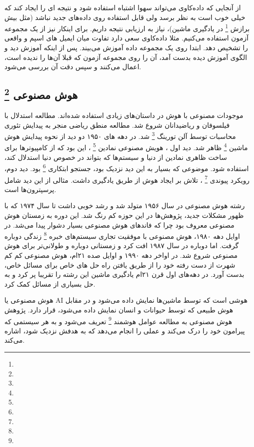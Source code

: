 \documentclass[a4paper, 12pt]{article}
\begin{document}
 از آنجایی که داده‌کاوی می‌تواند سهوا اشتباه استفاده شود و نتیجه ای را ایجاد کند که خیلی خوب است به نظر برسد ولی قابل استفاده روی داده‌های جدید نباشد (مثل بیش برازش
 \footnote{}
  در یادگیری ماشین)، نیاز به ارزیابی نتیجه داریم. برای اینکار نیز از یک مجموعه آزمون استفاده می‌کنیم. مثلا داده‌کاوی سعی دارد تفاوت میان ایمیل های اسپم و واقعی را تشخیص دهد. ابتدا روی یک مجموعه داده آموزش می‌بیند. پس از اینکه آموزش دید و الگوی آموزش دیده بدست آمد، آن را روی مجموعه آزمون که قبلا آن‌ها را ندیده است، اعمال می‌کنند و سپس دقت آن بررسی می‌شود. 
  
   \subsection*{هوش مصنوعی
   \footnote{}
	}
 موجودات مصنوعی با هوش در داستان‌های زیادی استفاده شده‌اند. مطالعه استدلال با  فیلسوفان و ریاضیدانان شروع شد.  مطالعه منطق ریاضی منجر به پیدایش تئوری محاسبات توسط آلن تورینگ 
 \footnote{}
 شد. در دهه های ۱۹۵۰ دو دید از نحوه پیدایش هوش ماشین 
 \footnote{}
 ظاهر شد. دید اول ، هویش مصنوعی نمادین 
 \footnote{}
 ، این بود که از کامپیوترها برای ساخت  
 ظاهری نمادین از دنیا و سیستم‌ها که بتواند در خصوص دنیا استدلال کند،
 استفاده شود. موضوعی که بسیار به این دید نزدیک بود، جستجو ابتکاری 
 \footnote{}
 بود. دید دوم، رویکرد پیوندی 
 \footnote{}
، تلاش بر ایجاد هوش از طریق یادگیری داشت. مثالی از این دید شامل پرسپترون‌ها است. 

رشته هوش مصنوعی در سال ۱۹۵۶ متولد شد و رشد خوبی داشت تا سال ۱۹۷۴ که با ظهور مشکلات جدید، پژوهش‌ها در این حوزه کم رنگ شد. این دوره به زمستان هوش مصنوعی معروف بود چرا که فاند‌های هوش مصنوعی بسیار دشوار پیدا می‌شد. در اوایل دهه ۱۹۸۰، هوش مصنوعی با موفقیت تجاری سیستم‌های خبره
\footnote{}
زندگی دوباره گرفت.  اما دوباره در سال ۱۹۸۷ افت کرد و زمستانی دوباره و طولانی‌تر برای هوش مصنوعی شروع شد. در اواخر دهه ۱۹۹۰ و اوایل صده ۲۱ام، هوش مصنوعی کم کم شهرت از دست رفته خود را   از طریق یافتن راه حل های خاص برای مسائل خاص، بدست آورد.
در دهه‌های اول قرن ۲۱ام یادگیری ماشین این رشته را تقریبا پر کرد و به حل بسیاری از مسائل کمک کرد.
 
 هوش مصنوعی یا AI هوشی است که توسط ماشین‌ها نمایش داده می‌شود و در مقابل هوش طبیعی که توسط حیوانات و انسان نمایش داده می‌شود، قرار دارد. پژوهش هوش مصنوعی به مطالعه عوامل هوشمند 
 \footnote{}
  تعریف می‌شود و به هر سیستمی که پیرامون خود را درک می‌کند و عملی را انجام می‌دهد که به هدفش نزدیک شود، اشاره می‌کند. 
 
\end{document}
